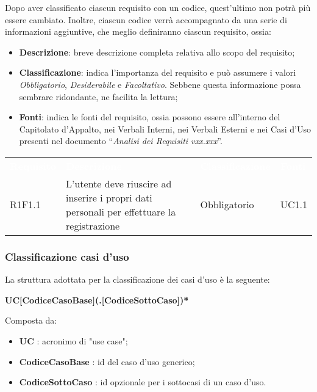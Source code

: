 Dopo aver classificato ciascun requisito con un codice, quest’ultimo non potrà più essere cambiato.
Inoltre, ciascun codice verrà accompagnato da una serie di informazioni aggiuntive, che meglio definiranno ciascun requisito, ossia:

\begin{itemize}
	\item \textbf{Descrizione}: breve descrizione completa relativa allo scopo del requisito;
	\item \textbf{Classificazione}: indica l’importanza del requisito e può assumere i valori \textit{Obbligatorio}, \textit{Desiderabile} e \textit{Facoltativo}. Sebbene questa informazione possa sembrare ridondante, ne facilita la lettura;
	\item \textbf{Fonti}: indica le fonti del requisito, ossia possono essere all'interno del Capitolato d’Appalto, nei Verbali Interni, nei Verbali Esterni e nei Casi d’Uso presenti nel documento “\textit{Analisi dei Requisiti vxx.xxx}”.
\end{itemize}


\begin{table}[!htbp]
\renewcommand{\arraystretch}{1.5}
\begin{tabular}{ m{}<{\centering}  m{}<{\centering}  m{}<{\centering}  m{}<{\centering}}
	\rowcolor{darkblue}
	\textcolor{white}{\textbf{Requisito}} &\textcolor{white}{\textbf{Descrizione}}& \textcolor{white}{\textbf{Classificazione}} & \textcolor{white}{\textbf{Fonti}}\\ 

	\rowcolor{gray!10} R1F1.1 & L’utente deve riuscire ad inserire i propri dati personali per effettuare la registrazione & Obbligatorio & UC1.1 \\	

\end{tabular}
\end{table}

\subsubsection{Classificazione casi d'uso}
La struttura adottata per la classificazione dei casi d'uso è la seguente: \\
\centerline{\textbf{UC[CodiceCasoBase](.[CodiceSottoCaso])*}}
Composta da:
\begin{itemize}
\item \textbf{UC} : acronimo di "use case";
\item \textbf{CodiceCasoBase} : id del caso d'uso generico;
\item \textbf{CodiceSottoCaso} : id opzionale per i sottocasi di un caso d'uso.
\end{itemize}

